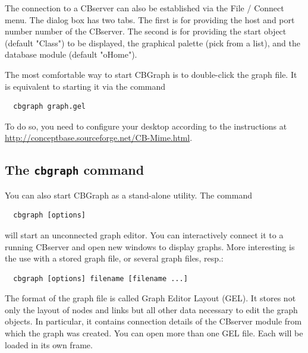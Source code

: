 The connection to a CBserver can also be established via the File / Connect
menu. The dialog box has two tabs. The first is for providing the host
and port number number of the CBserver. The second is for providing the 
start object (default "Class") to be displayed, the graphical palette (pick from
a list), and the database module (default "oHome").

The most comfortable way to start CBGraph is to double-click the graph file. It is equivalent
to starting it via the command 

{\small
\begin{verbatim}
  cbgraph graph.gel
\end{verbatim}
}

To do so, you need to configure your desktop according to the instructions at
\url{http://conceptbase.sourceforge.net/CB-Mime.html}.



\subsection{The {\tt cbgraph} command}
\label{sec:cbgraphcmd}
You can also start CBGraph as a stand-alone utility. The command

{\small
\begin{verbatim}
  cbgraph [options]
\end{verbatim}
}

will start an unconnected graph editor. You can interactively connect it to a running CBserver
and open new windows to display graphs. More interesting is the use with a stored graph file,
or several graph files, resp.:

{\small
\begin{verbatim}
  cbgraph [options] filename [filename ...]
\end{verbatim}
}

The format of the graph file is called Graph Editor Layout (GEL). It stores not only the layout of nodes
and links but all other data necessary to edit the graph objects. In particular, it contains
connection details of the CBserver module from which the graph was created. You can open more than one
GEL file. Each will be loaded in its own frame. 


